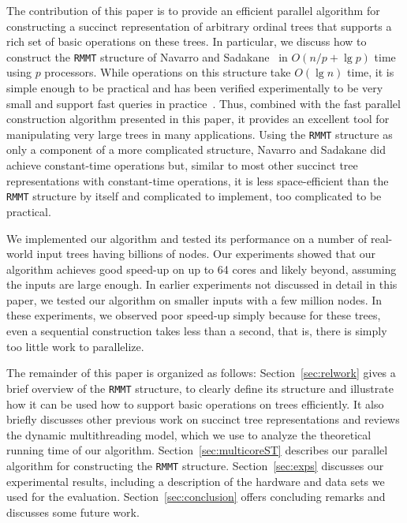 The contribution of this paper is to provide an efficient parallel algorithm
for constructing a succinct representation of arbitrary ordinal trees that
supports a rich set of basic operations on these trees.
In particular, we discuss how to construct the {\tt RMMT} structure of
Navarro and Sadakane~\cite{Navarro:2014:FFS:2620785.2601073} in
$O(n/p + \lg p)$ time using $p$ processors.
While operations on this structure take $O(\lg n)$ time, it is simple enough
to be practical and has been verified experimentally to be very small and
support fast queries in practice~\cite{ACNSalenex10}.
Thus, combined with the fast parallel construction algorithm presented in this
paper, it provides an excellent tool for manipulating very large trees in
many applications.
Using the {\tt RMMT} structure as only a component of a more complicated
structure, Navarro and Sadakane did achieve constant-time operations but,
similar to most other succinct tree representations with constant-time
operations, it is less space-efficient than the {\tt RMMT} structure by itself
and complicated to implement, too complicated to be practical.

We implemented our algorithm and tested its performance on a number of
real-world input trees having billions of nodes.
Our experiments showed that our algorithm achieves good speed-up on up to
64 cores and likely beyond, assuming the inputs are large enough.
In earlier experiments not discussed in detail in this paper, we tested our
algorithm on smaller inputs with a few million nodes.
In these experiments, we observed poor speed-up simply because for these
trees, even a sequential construction takes less than a second, that is, there
is simply too little work to parallelize.

The remainder of this paper is organized as follows:
Section~\ref{sec:relwork} gives a brief overview of the {\tt RMMT} structure,
to clearly define its structure and illustrate how it can be used how to support
basic operations on trees efficiently.
It also briefly discusses other previous work on succinct tree representations
and reviews the dynamic multithreading model, which we use to analyze the
theoretical running time of our algorithm.
Section~\ref{sec:multicoreST} describes our parallel algorithm for constructing
the {\tt RMMT} structure.
Section~\ref{sec:exps} discusses our experimental results, including a
description of the hardware and data sets we used for the evaluation.
Section~\ref{sec:conclusion} offers concluding remarks and discusses some
future work.
